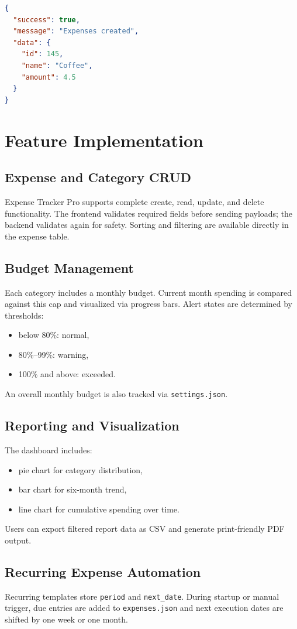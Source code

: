 \documentclass[conference]{IEEEtran}
\begin{document}
\begin{lstlisting}[language=json,caption={Standard Success Response}]
{
  "success": true,
  "message": "Expenses created",
  "data": {
    "id": 145,
    "name": "Coffee",
    "amount": 4.5
  }
}
\end{lstlisting}

\section{Feature Implementation}
\subsection{Expense and Category CRUD}
Expense Tracker Pro supports complete create, read, update, and delete functionality. The frontend validates required fields before sending payloads; the backend validates again for safety. Sorting and filtering are available directly in the expense table.

\subsection{Budget Management}
Each category includes a monthly budget. Current month spending is compared against this cap and visualized via progress bars. Alert states are determined by thresholds:
\begin{itemize}
    \item below 80\%: normal,
    \item 80\%--99\%: warning,
    \item 100\% and above: exceeded.
\end{itemize}
An overall monthly budget is also tracked via \texttt{settings.json}.

\subsection{Reporting and Visualization}
The dashboard includes:
\begin{itemize}
    \item pie chart for category distribution,
    \item bar chart for six-month trend,
    \item line chart for cumulative spending over time.
\end{itemize}
Users can export filtered report data as CSV and generate print-friendly PDF output.

\subsection{Recurring Expense Automation}
Recurring templates store \texttt{period} and \texttt{next\_date}. During startup or manual trigger, due entries are added to \texttt{expenses.json} and next execution dates are shifted by one week or one month.
\end{document}
